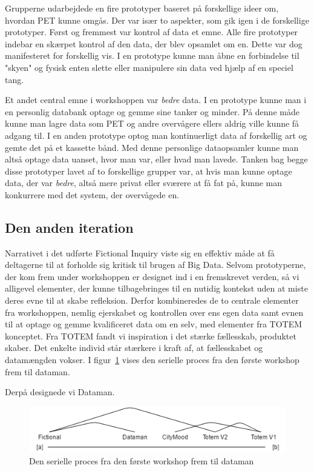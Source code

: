 Grupperne udarbejdede en fire prototyper baseret på forskellige ideer om, hvordan PET kunne omgås. Der var især to aspekter, som gik igen i de forskellige prototyper. Først og fremmest var kontrol af data et emne. Alle fire prototyper indebar en skærpet kontrol af den data, der blev opsamlet om en. Dette var dog manifesteret for forskellig vis. I en prototype kunne man åbne en forbindelse til "skyen" og fysisk enten slette eller manipulere sin data ved hjælp af en speciel tang. 

Et andet central emne i workshoppen var \textit{bedre} data. I en prototype kunne man i en personlig databank optage og gemme sine tanker og minder. På denne måde kunne man lagre data som PET og andre overvågere ellers aldrig ville kunne få adgang til. I en anden prototype optog man kontinuerligt data af forskellig art og gemte det på et kassette bånd. Med denne personlige dataopsamler kunne man altså optage data uanset, hvor man var, eller hvad man lavede. Tanken bag begge disse prototyper lavet af to forskellige grupper var, at hvis man kunne optage data, der var \textit{bedre}, altså mere privat eller sværere at få fat på, kunne man konkurrere med det system, der overvågede en.

\subsection*{Den anden iteration}
Narrativet i det udførte Fictional Inquiry viste sig en effektiv måde at få deltagerne til at forholde sig kritisk til brugen af Big Data. Selvom prototyperne, der kom frem under workshoppen er designet ind i en fremskrevet verden, så vi alligevel elementer, der kunne tilbagebringes til en nutidig kontekst uden at miste deres evne til at skabe refleksion. Derfor kombineredes de to centrale elementer fra workshoppen, nemlig ejerskabet og kontrollen over ens egen data samt evnen til at optage og gemme kvalificeret data om en selv, med elementer fra TOTEM konceptet. Fra TOTEM fandt vi inspiration i det stærke fællesskab, produktet skaber. Det enkelte individ står stærkere i kraft af, at fællesskabet og datamængden vokser. I figur~\ref{fig:abakse} vises den serielle proces fra den første workshop frem til dataman.

Derpå designede vi Dataman.

\begin{figure}
    \centering
    \includegraphics[width = \textwidth]{Pictures/abakse.png}
    \caption{Den serielle proces fra den første workshop frem til dataman}
    \label{fig:abakse}
\end{figure}

